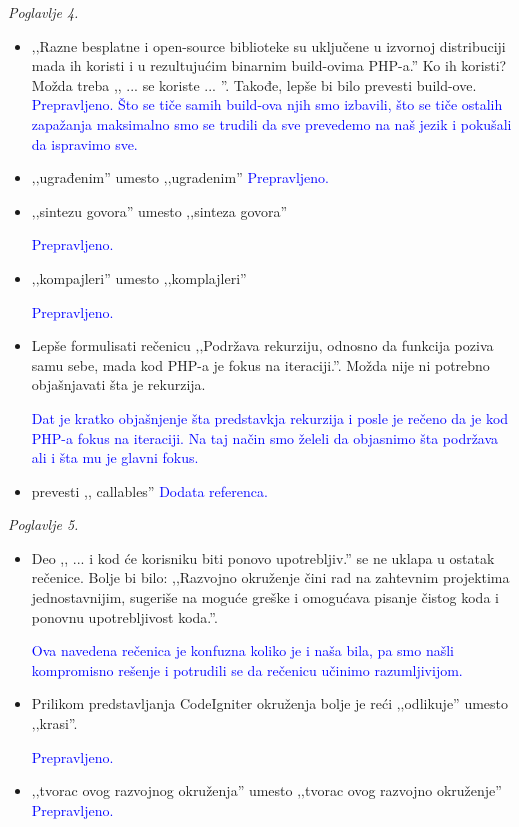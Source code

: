 \documentclass[a4paper]{report}
\newcommand{\odgovor}[1]{\textcolor{blue}{#1}}
\begin{document}
\textit{Poglavlje 4.}
\begin{itemize}
\item ‚‚Razne besplatne i open-source biblioteke su uključene u izvornoj distribuciji mada ih koristi i u rezultujućim binarnim build-ovima PHP-a.'' Ko ih koristi? Možda treba ,, ... se koriste ... ''. Takođe, lepše bi bilo prevesti build-ove.
\odgovor{Prepravljeno. Što se tiče samih build-ova njih smo izbavili, što se tiče ostalih zapažanja maksimalno smo se trudili da sve prevedemo na naš jezik i pokušali da ispravimo sve.}

\item ‚‚ugrađenim'' umesto ‚‚ugradenim''
\odgovor{Prepravljeno.}

\item ‚‚sintezu govora'' umesto ‚‚sinteza govora''

\odgovor{Prepravljeno.}

\item ‚‚kompajleri'' umesto ‚‚komplajleri''

\odgovor{Prepravljeno.}

\item Lepše formulisati rečenicu ‚‚Podržava rekurziju, odnosno da funkcija poziva samu sebe, mada kod PHP-a je fokus na iteraciji.''. Možda nije ni potrebno objašnjavati šta je rekurzija.

\odgovor{Dat je kratko objašnjenje šta predstavkja rekurzija i posle je rečeno da je kod PHP-a fokus na iteraciji. Na taj način smo želeli da objasnimo šta podržava ali i šta mu je glavni fokus.}
\item prevesti ,, callables''
\odgovor{Dodata referenca.}
\\
\end{itemize}

\textit{Poglavlje 5.}
\begin{itemize}
\item Deo ,, ... i kod će korisniku biti ponovo upotrebljiv.'' se ne uklapa u ostatak rečenice. Bolje bi bilo: ,,Razvojno okruženje čini rad na zahtevnim projektima jednostavnijim, sugeriše na moguće greške i omogućava pisanje čistog koda i ponovnu upotrebljivost koda.''.

\odgovor{Ova navedena rečenica je konfuzna koliko je i naša bila, pa smo našli kompromisno rešenje i potrudili se da rečenicu učinimo razumljivijom.}

\item Prilikom predstavljanja CodeIgniter okruženja bolje je reći ‚‚odlikuje'' umesto ‚‚krasi''.

\odgovor{Prepravljeno.}

\item ‚‚tvorac ovog razvojnog okruženja'' umesto ‚‚tvorac ovog razvojno okruženje''\\

\odgovor{Prepravljeno.}
\end{itemize}
\end{document}
